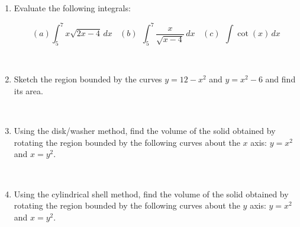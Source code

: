 \documentclass[11pt, oneside]{article}   	%
\title{}
\author{Week 4 discussion problems}
\date{}							%
\begin{document}
\maketitle

\begin{enumerate}

\item Evaluate the following integrals:

 
$$ (a) \int_5^7 x \sqrt{2x-4} \, dx \ \ \ \  (b) \ \  \int_5^7 \dfrac{x}{\sqrt{x-4} } \,  dx \ \ \ \  (c) \ \ \int \cot(x) \, dx $$

\

\item  Sketch the region bounded by the curves $y=12-x^2$ and $y=x^2-6$ and find its area.

\



\item Using the disk/washer method, find the volume of the solid obtained by rotating the region bounded by the following curves about the $x$ axis: $y=x^2$ and $x=y^2$.

\

\item Using the cylindrical shell method, find the volume of the solid obtained by rotating the region bounded by the following curves about the $y$ axis: $y=x^2$ and $x=y^2$.

\end{enumerate}
\end{document}
